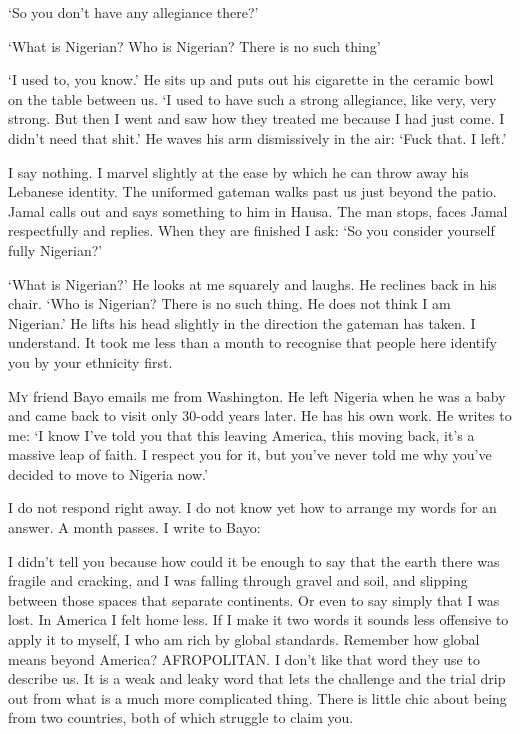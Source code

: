 \documentclass[../main.tex]{subfiles}
\begin{document}
\begin{multicols}{2}
‘So you don’t have any allegiance there?’ 

\begin{pullquote}
 ‘What is Nigerian? Who is Nigerian? There is no such thing’ 
\end{pullquote}

‘I used to, you know.’ He sits up and puts out his cigarette in the ceramic bowl on the table between us. ‘I used to have such a strong allegiance, like very, very strong. But then I went and saw how they treated me because I had just come. I didn’t need that shit.’ He waves his arm dismissively in the air: ‘Fuck that. I left.’ 

I say nothing. I marvel slightly at the ease by which he can throw away his Lebanese identity. The uniformed gateman walks past us just beyond the patio. Jamal calls out and says something to him in Hausa. The man stops, faces Jamal respectfully and replies. When they are finished I ask: ‘So you consider yourself fully Nigerian?’ 

‘What is Nigerian?’ He looks at me squarely and laughs. He reclines back in his chair. ‘Who is Nigerian? There is no such thing. He does not think I am Nigerian.’ He lifts his head slightly in the direction the gateman has taken. I understand. It took me less than a month to recognise that people here identify you by your ethnicity first. 

\lettrine{M}{y} friend Bayo emails me from Washington. He left Nigeria when he was a baby and came back to visit only 30-odd years later. He has his own work. He writes to me: ‘I know I’ve told you that this leaving America, this moving back, it’s a massive leap of faith. I respect you for it, but you’ve never told me why you’ve decided to move to Nigeria now.’ 

I do not respond right away. I do not know yet how to arrange my words for an answer. A month passes. I write to Bayo: 

\begin{blockquote}
 I didn’t tell you because how could it be enough to say that the earth there was fragile and cracking, and I was falling through gravel and soil, and slipping between those spaces that separate continents. Or even to say simply that I was lost. In America I felt home less. If I make it two words it sounds less offensive to apply it to myself, I who am rich by global standards. Remember how global means beyond America? AFROPOLITAN. I don’t like that word they use to describe us. It is a weak and leaky word that lets the challenge and the trial drip out from what is a much more complicated thing. There is little chic about being from two countries, both of which struggle to claim you. 


\end{blockquote}
\end{multicols}
\end{document}
